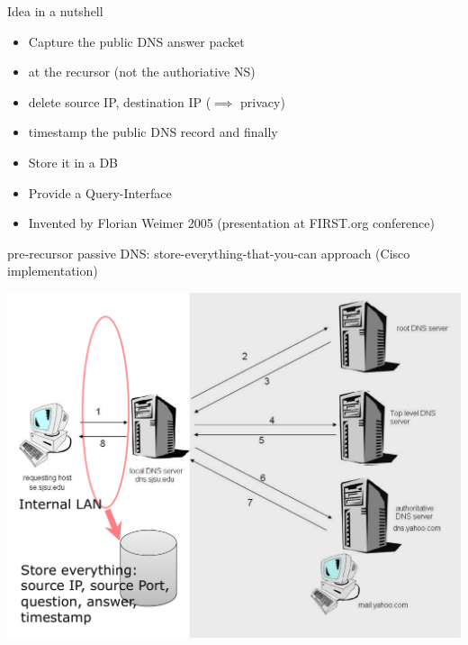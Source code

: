 
\begin{frame}[t,plain]
    \titlepage
\end{frame}

\begin{frame}[t]{Idea in a nutshell}
\begin{itemize}
\item Capture the public DNS answer packet 
\item at the recursor (not the authoriative NS)
\item delete source IP, destination IP ($\implies$ privacy)
\item timestamp the public DNS record and finally
\item Store it in a DB
\item Provide a Query-Interface
\item Invented by Florian Weimer 2005 (presentation at FIRST.org conference)
\end{itemize}
\end{frame}


\begin{frame}[t]{pre-recursor passive DNS: store-everything-that-you-can approach (Cisco implementation)}
\begin{centering}
  \vbox{}\vfill
  \includegraphics[scale=0.25]{pre-recursor.png}
  \vfill
\end{centering}
\end{frame}

